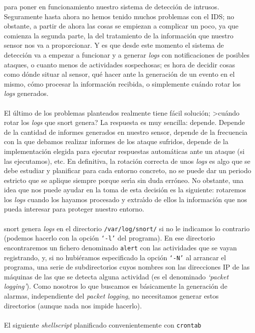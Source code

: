 para poner en funcionamiento nuestro sistema de detecci\'on de intrusos.
Seguramente hasta ahora no hemos tenido muchos problemas con el IDS; no 
obstante, a partir de ahora las cosas se empiezan a complicar un poco, ya que
comienza la segunda parte, la del tratamiento de la informaci\'on que nuestro
sensor nos va a proporcionar. Y es que desde este momento el sistema de
detecci\'on va a empezar a funcionar y a generar {\it logs} con notificaciones
de posibles ataques, o cuanto menos de actividades sospechosas; es hora de
decidir cosas como d\'onde situar al sensor, qu\'e hacer ante la generaci\'on 
de un evento en el mismo, c\'omo procesar la informaci\'on recibida, o 
simplemente cu\'ando rotar los {\it logs} generados.\\
\\El \'ultimo de los problemas planteados realmente tiene f\'acil soluci\'on;
>cu\'ando rotar los {\it logs} que {\sc snort} genera? La respuesta es muy 
sencilla: depende. Depende de la cantidad de informes generados en nuestro
sensor, depende de la frecuencia con la que debamos realizar informes de los
ataque sufridos, depende de la implementaci\'on elegida para ejecutar 
respuestas autom\'aticas ante un ataque (si las ejecutamos), etc. En definitiva,
la rotaci\'on correcta de unos {\it logs} es algo que se debe estudiar y 
planificar para cada entorno concreto, no se puede dar un periodo estricto que
se aplique siempre porque ser\'{\i}a sin duda err\'oneo. No obstante, una idea
que nos puede ayudar en la toma de esta decisi\'on es la siguiente: rotaremos
los {\it logs} cuando los hayamos procesado y extra\'{\i}do de ellos la 
informaci\'on que nos pueda interesar para proteger nuestro entorno.\\
\\{\sc snort} genera {\it logs} en el directorio {\tt /var/log/snort/} si no
le indicamos lo contrario (podemos hacerlo con la opci\'on {\tt `-l'} del
programa). En ese directorio encontraremos un fichero denominado {\tt alert}
con las actividades que se vayan registrando, y, si no hubi\'eramos especificado
la opci\'on {\tt `-N'} al arrancar el programa, una serie de subdirectorios 
cuyos nombres son las direcciones IP de las m\'aquinas de las que se detecta
alguna actividad (es el denominado {\it `packet logging'}). Como nosotros lo 
que buscamos es b\'asicamente la generaci\'on de alarmas, independiente del
{\it packet logging}, no necesitamos generar estos directorios (aunque nada
nos impide hacerlo).\\
\\El siguiente {\it shellscript} planificado convenientemente con {\tt crontab}
